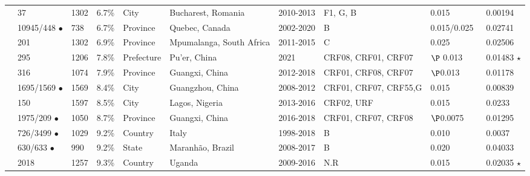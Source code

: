 \documentclass[utf8]{FrontiersinHarvard} %
\begin{document}
\begin{table}[h!]
\begin{ssmall}
\begin{tabular}{llllllllll}
			\cite{Temereanca:2017aa}    & 37                  & 1302 & 6.7\%  & City       & Bucharest, Romania       & 2010-2013 & F1, G, B              & 0.015                                        & 0.00194          \\
			\cite{brenner_role_2021}    & 10945/448 $\bullet$ & 738  & 6.7\%  & Province   & Quebec, Canada           & 2002-2020 & B                     & 0.015/0.025\                                   & 0.02741          \\
			\citet{sivay_hiv-1_2018}    & 201                 & 1302 & 6.9\%  & Province   & Mpumalanga, South Africa & 2011-2015 & C                     & 0.025                                        & 0.02506          \\
			\cite{Li:2022aa}            & 295                 & 1206 & 7.8\%  & Prefecture & Pu'er, China             & 2021      & CRF08, CRF01, CRF07   & $\P$ 0.013                                   & 0.01483  $\star$ \\
			\cite{Yu:2022aa}            & 316                 & 1074 & 7.9\%  & Province   & Guangxi, China           & 2012-2018 & CRF01, CRF08, CRF07   & $\P$0.013                                    & 0.01178          \\
			\cite{Yan:2021aa}           & 1695/1569 $\bullet$ & 1569 & 8.4\%  & City       & Guangzhou, China         & 2008-2012 & CRF01, CRF07, CRF55,G & 0.015                                        & 0.00839          \\
			\cite{Billings:2019aa}      & 150                 & 1597 & 8.5\%  & City       & Lagos, Nigeria           & 2013-2016 & CRF02, URF            & 0.015                                        & 0.0233           \\
			\cite{Chen:2023aa}          & 1975/209  $\bullet$ & 1050 & 8.7\%  & Province   & Guangxi, China           & 2016-2018 & CRF01, CRF07, CRF08   & $\P$0.0075                                   & 0.01295          \\
			\cite{Fabeni:2020aa}        & 726/3499 $\bullet$  & 1029 & 9.2\%  & Country    & Italy                    & 1998-2018 & B                     & 0.010                                        & 0.0037           \\
			\cite{Leal:2020aa}          & 630/633 $\bullet$   & 990  & 9.2\%  & State      & Maranhão, Brazil         & 2008-2017 & B                     & 0.020                                        & 0.04033          \\
			\cite{bbosa_short_2020}     & 2018                & 1257 & 9.3\%  & Country    & Uganda                   & 2009-2016 & N.R                   & 0.015                                        & 0.02035 $\star$  \\

\end{tabular}
\end{ssmall}
\end{table}
\end{document}

